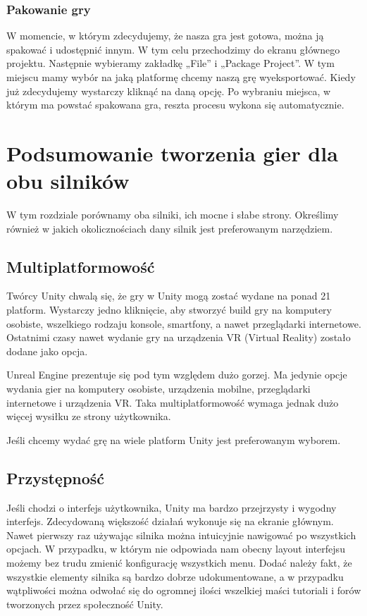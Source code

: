 \documentclass[openright]{xmgr}
\begin{document}
\subsection{Pakowanie gry}

W momencie, w którym zdecydujemy, że nasza gra jest gotowa, można ją spakować i udostępnić innym. W tym celu przechodzimy do ekranu głównego projektu. Następnie wybieramy zakładkę „File” i „Package Project”. W tym miejscu mamy wybór na jaką platformę chcemy naszą grę wyeksportować. Kiedy już zdecydujemy wystarczy kliknąć na daną opcję. Po wybraniu miejsca, w którym ma powstać spakowana gra, reszta procesu wykona się automatycznie.

\chapter{Podsumowanie tworzenia gier dla obu silników}

W tym rozdziale porównamy  oba silniki, ich mocne i słabe strony. Określimy również w jakich okolicznościach dany silnik jest preferowanym narzędziem.

\section{Multiplatformowość}

Twórcy Unity chwalą się, że gry w Unity mogą zostać wydane na ponad 21 platform. Wystarczy jedno kliknięcie, aby stworzyć build gry na komputery osobiste, wszelkiego rodzaju konsole, smartfony, a nawet przeglądarki internetowe. Ostatnimi czasy nawet wydanie gry na urządzenia VR (Virtual Reality) zostało dodane jako opcja.

Unreal Engine prezentuje się pod tym względem dużo gorzej. Ma jedynie opcje wydania gier na komputery osobiste, urządzenia mobilne, przeglądarki internetowe i urządzenia VR. Taka multiplatformowość wymaga jednak dużo więcej wysiłku ze strony użytkownika.

Jeśli chcemy wydać grę na wiele platform Unity jest preferowanym wyborem.

\section{Przystępność}

Jeśli chodzi o interfejs użytkownika, Unity ma bardzo przejrzysty i wygodny interfejs. Zdecydowaną większość działań wykonuje się na ekranie głównym. Nawet pierwszy raz używając silnika można intuicyjnie nawigować po wszystkich opcjach.
W przypadku, w którym nie odpowiada nam obecny layout interfejsu możemy bez trudu zmienić konfigurację wszystkich menu.
Dodać należy fakt, że wszystkie elementy silnika są bardzo dobrze udokumentowane, a w przypadku wątpliwości można odwołać się do ogromnej ilości wszelkiej maści tutoriali i forów tworzonych przez społeczność Unity.
\end{document}
